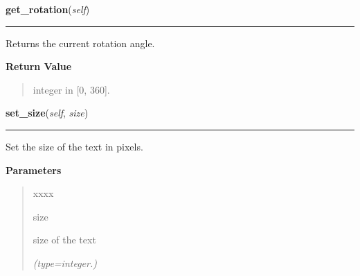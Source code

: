     \label{pygtk_chart:label:Label:get_rotation}

    \vspace{0.5ex}

\hspace{.8\funcindent}\begin{boxedminipage}{\funcwidth}

    \raggedright \textbf{get\_rotation}(\textit{self})

    \vspace{-1.5ex}

    \rule{\textwidth}{0.5\fboxrule}
\setlength{\parskip}{2ex}
    Returns the current rotation angle.

\setlength{\parskip}{1ex}
      \textbf{Return Value}
    \vspace{-1ex}

      \begin{quote}
      integer in [0, 360].

      \end{quote}

    \end{boxedminipage}

    \label{pygtk_chart:label:Label:set_size}

    \vspace{0.5ex}

\hspace{.8\funcindent}\begin{boxedminipage}{\funcwidth}

    \raggedright \textbf{set\_size}(\textit{self}, \textit{size})

    \vspace{-1.5ex}

    \rule{\textwidth}{0.5\fboxrule}
\setlength{\parskip}{2ex}
    Set the size of the text in pixels.

\setlength{\parskip}{1ex}
      \textbf{Parameters}
      \vspace{-1ex}

      \begin{quote}
        \begin{Ventry}{xxxx}

          \item[size]

          size of the text

            {\it (type=integer.)}

        \end{Ventry}

      \end{quote}

    \end{boxedminipage}

